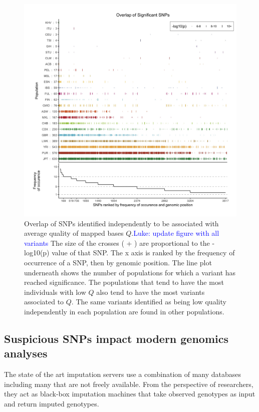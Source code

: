 \documentclass[9pt,lineno]{elife}
\newcommand{\luke}[1]{\textcolor{blue}{Luke: #1}}
\begin{document}
\begin{figure}
\includegraphics[width=\hsize,keepaspectratio]{./Figures/SNPOverlap6.jpg}

\caption{Overlap of SNPs identified independently to be associated with average quality of mapped bases $Q$.\luke{update figure with all variants} 
The size of the crosses ( + ) are proportional to the -log10(p) value of that SNP.
The x axis is ranked by the frequency of occurrence of a SNP, then by genomic position.
The line plot underneath shows the number of populations for which a variant has reached significance.
The populations that tend to have the most individuals with low $Q$ also tend to have the most variants associated to $Q$. 
The same variants identified as being low quality independently in each population are found in other populations. }
  \label{OverLap}
\end{figure}

\subsection{Suspicious SNPs impact modern genomics analyses}
The state of the art imputation servers use a combination of many databases including many that are not freely available.
From the perspective of researchers, they act as black-box imputation machines that take observed genotypes as input and return imputed genotypes.  
\end{document}
